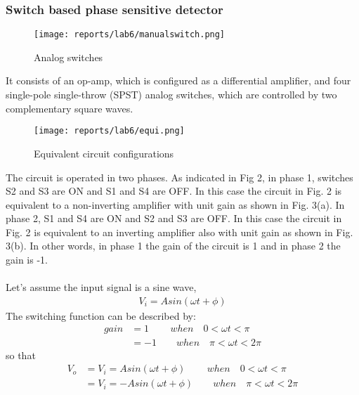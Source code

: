 \documentclass[12pt]{article}
\begin{document}
        \subsubsection{Switch based phase sensitive detector}
            \begin{figure}[H]
                \centering
                \texttt{[image: reports/lab6/manualswitch.png]}
                \caption{Analog switches}
            \end{figure}
            \noindent
            It consists of an op-amp, which is configured as a differential amplifier, and four single-pole single-throw (SPST) analog switches, which are controlled by two complementary square waves.
            \begin{figure}[H]
                \centering
                \texttt{[image: reports/lab6/equi.png]}
                \caption{Equivalent circuit configurations}
            \end{figure}
            \noindent
            The circuit is operated in two phases. As indicated in Fig 2, in phase 1, switches S2 and S3 are ON and S1 and S4 are OFF. In this case the circuit in Fig. 2 is equivalent to a non-inverting amplifier with unit gain as shown in Fig. 3(a). In phase 2, S1 and S4 are ON and S2 and S3 are OFF. In this case the circuit in Fig. 2 is equivalent to an inverting amplifier also with unit gain as shown in Fig. 3(b). In other words, in phase 1 the gain of the circuit is 1 and in phase 2 the gain is -1.
            \\\\
            Let's assume the input signal is a sine wave,
            \begin{align}
                V_i = A sin(\omega t + \phi)
            \end{align}
            \noindent
            The switching function can be described by:
            \begin{align}
                gain &= 1 \qquad \, when \quad 0 < \omega t < \pi \\
                     &= -1 \qquad when \quad \pi < \omega t < 2\pi
            \end{align}
            \noindent
            so that
            \begin{align}
                V_o &= V_i = A sin(\omega t + \phi) \qquad \, when \quad 0 < \omega t < \pi \\
                     &= V_i = -A sin(\omega t + \phi) \qquad when \quad \pi < \omega t < 2\pi
            \end{align}
            
\end{document}
